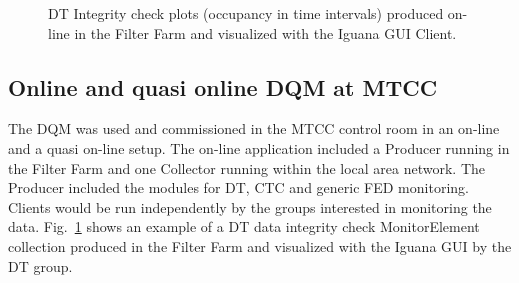 \documentclass[a4paper]{cmspaper}
\begin{document}
\begin{figure}[hbtp]
  \begin{center}
\caption{DT Integrity check plots (occupancy in time intervals) produced on-line in the Filter Farm and visualized with the Iguana GUI Client.}
\label{fig:dtlayout}
 \end{center}
\end{figure}


\subsection{Online and quasi online DQM at MTCC}

The DQM was used and commissioned in the MTCC control room in an on-line and a quasi on-line setup.
The on-line application included a Producer running in the Filter Farm and one Collector running within the local area network. 
The Producer included the modules for DT, CTC and generic FED monitoring. Clients would be run independently by the groups interested 
in monitoring the data. Fig.~\ref{fig:dtlayout} shows an example of a DT data integrity check MonitorElement collection 
produced in the Filter Farm and visualized with the Iguana GUI by the DT group.
\end{document}
